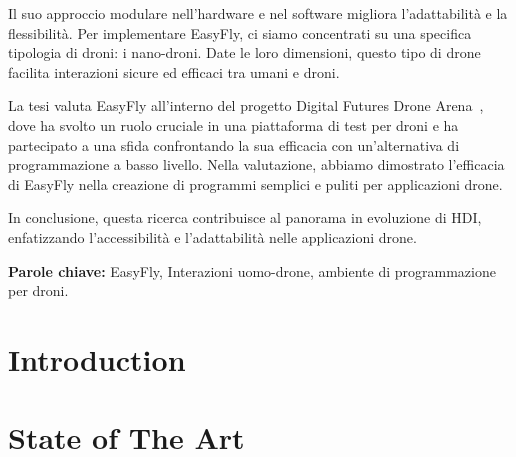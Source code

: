 \documentclass{Configuration_Files/PoliMi3i_thesis}
\begin{document}
Il suo approccio modulare nell'hardware e nel software migliora l'adattabilità e la flessibilità. 
Per implementare EasyFly, ci siamo concentrati su una specifica tipologia di droni: i nano-droni. 
Date le loro dimensioni, questo tipo di drone facilita interazioni sicure ed efficaci tra umani e droni.

La tesi valuta EasyFly all'interno del progetto Digital Futures Drone Arena~\cite{dronearena}, dove ha svolto un ruolo cruciale in una piattaforma di test per droni e ha partecipato a una sfida confrontando la sua efficacia con un'alternativa di programmazione a basso livello. 
Nella valutazione, abbiamo dimostrato l'efficacia di EasyFly nella creazione di programmi semplici e puliti per applicazioni drone.

In conclusione, questa ricerca contribuisce al panorama in evoluzione di HDI, enfatizzando l'accessibilità e l'adattabilità nelle applicazioni drone.

\textbf{Parole chiave:} EasyFly, Interazioni uomo-drone, ambiente di programmazione per droni. %


\thispagestyle{empty}
\tableofcontents %
\thispagestyle{empty}
\cleardoublepage


\mainmatter %

\chapter{Introduction}
\label{ch:intro}


\chapter{State of The Art}
\label{ch:soa}

\end{document}
